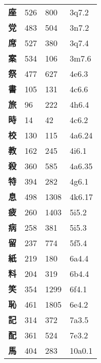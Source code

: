 \begin{longtable}[c]{llll}
    \bfseries 座 & 526 & 800 & 3q7.2\\
    \bfseries 党 & 483 & 504 & 3n7.2\\
    \bfseries 席 & 527 & 380 & 3q7.4\\
    \bfseries 案 & 534 & 106 & 3m7.6\\
    \bfseries 祭 & 477 & 627 & 4e6.3\\
    \bfseries 書 & 105 & 131 & 4c6.6\\
    \bfseries 旅 & 96 & 222 & 4h6.4\\
    \bfseries 時 & 14 & 42 & 4c6.2\\
    \bfseries 校 & 130 & 115 & 4a6.24\\
    \bfseries 教 & 162 & 245 & 4i6.1\\
    \bfseries 殺 & 360 & 585 & 4a6.35\\
    \bfseries 特 & 394 & 282 & 4g6.1\\
    \bfseries 息 & 498 & 1308 & 4k6.17\\
    \bfseries 疲 & 260 & 1403 & 5i5.2\\
    \bfseries 病 & 258 & 381 & 5i5.3\\
    \bfseries 留 & 237 & 774 & 5f5.4\\
    \bfseries 紙 & 219 & 180 & 6a4.4\\
    \bfseries 料 & 204 & 319 & 6b4.4\\
    \bfseries 笑 & 354 & 1299 & 6f4.1\\
    \bfseries 恥 & 461 & 1805 & 6e4.2\\
    \bfseries 記 & 314 & 372 & 7a3.5\\
    \bfseries 配 & 361 & 524 & 7e3.2\\
    \bfseries 馬 & 404 & 283 & 10a0.1\\
  \end{longtable}
